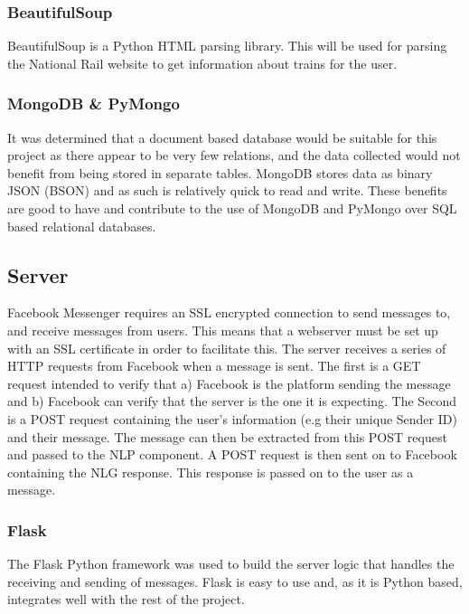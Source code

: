 \documentclass[12pt,a4paper]{article}
\begin{document}
    \subsubsection*{BeautifulSoup}
    \label{subsubsection:BeautifulSoup}
    BeautifulSoup is a Python HTML parsing library. This will be used for parsing the National Rail website to get information about trains for the user.
    
    \subsubsection*{MongoDB \& PyMongo}
    \label{subsubsection:mongodb}
    It was determined that a document based database would be suitable for this project as there appear to be very few relations, and the data collected would not benefit from being stored in separate tables. MongoDB stores data as binary JSON (BSON) \citep{korneliusz_2014} and as such is relatively quick to read and write. These benefits are good to have and contribute to the use of MongoDB and PyMongo over SQL based relational databases.
    
    \subsection{Server}
    \label{subsection:Server}
    Facebook Messenger requires an SSL encrypted connection to send messages to, and receive messages from users. This means that a webserver must be set up with an SSL certificate in order to facilitate this. The server receives a series of HTTP requests from Facebook when a message is sent. The first is a GET request intended to verify that a) Facebook is the platform sending the message and b) Facebook can verify that the server is the one it is expecting. The Second is a POST request containing the user's information (e.g their unique Sender ID) and their message. The message can then be extracted from this POST request and passed to the NLP component. A POST request is then sent on to Facebook containing the NLG response. This response is passed on to the user as a message.
    
    \subsubsection*{Flask}
    The Flask Python framework was used to build the server logic that handles the receiving and sending of messages. Flask is easy to use and, as it is Python based, integrates well with the rest of the project.
    
\end{document}
